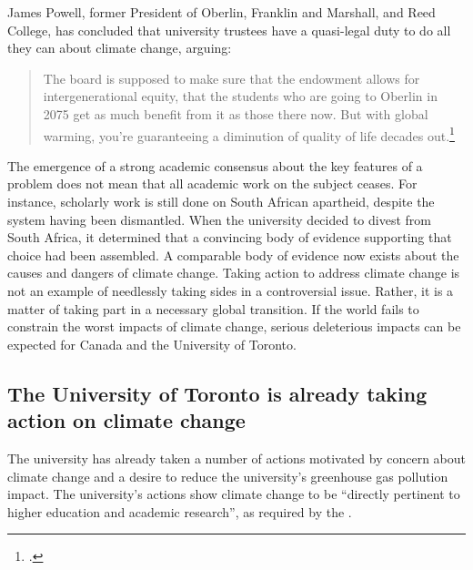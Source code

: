 


James Powell, former President of Oberlin, Franklin and Marshall, and Reed College, has concluded that university trustees have a quasi-legal duty to do all they can about climate change, arguing:
\begin{quotation}
The board is supposed to make sure that the endowment allows for intergenerational equity, that the students who are going to Oberlin in 2075 get as much benefit from it as those there now. But with global warming, you’re guaranteeing a diminution of quality of life decades out.\footcite[][]{CaseForDivestment}
\end{quotation}
The emergence of a strong academic consensus about the key features of a problem does not mean that all academic work on the subject ceases.
For instance, scholarly work is still done on South African apartheid, despite the system having been dismantled.
When the university decided to divest from South Africa, it determined that a convincing body of evidence supporting that choice had been assembled.
A comparable body of evidence now exists about the causes and dangers of climate change.
Taking action to address climate change is not an example of needlessly taking sides in a controversial issue. Rather, it is a matter of taking part in a necessary global transition. 
If the world fails to constrain the worst impacts of climate change, serious deleterious impacts can be expected for Canada and the University of Toronto.



	\subsection{The University of Toronto is already taking action on climate change}
	\label{UTTakenSides}

The university has already taken a number of actions motivated by concern about climate change and a desire to reduce the university's greenhouse gas pollution impact.
The university's actions show climate change to be ``directly pertinent to higher education and academic research'', as required by the .



